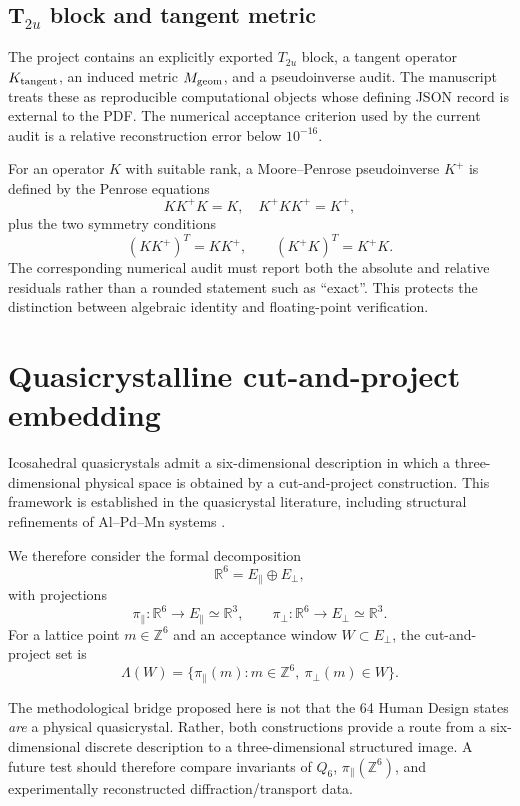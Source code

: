 \documentclass[11pt,a4paper]{article}
\numberwithin{equation}{section}
\newcommand{\R}{\mathbb{R}}
\newcommand{\Z}{\mathbb{Z}}
\begin{document}
\subsection{T$_{2u}$ block and tangent metric}

The project contains an explicitly exported $T_{2u}$ block, a tangent operator $K_{\rm tangent}$, an induced metric $M_{\rm geom}$, and a pseudoinverse audit. The manuscript treats these as reproducible computational objects whose defining JSON record is external to the PDF. The numerical acceptance criterion used by the current audit is a relative reconstruction error below $10^{-16}$.

For an operator $K$ with suitable rank, a Moore--Penrose pseudoinverse $K^+$ is defined by the Penrose equations
\[
KK^+K=K,\quad K^+KK^+=K^+,
\]
plus the two symmetry conditions
\[
(KK^+)^T=KK^+,
\qquad
(K^+K)^T=K^+K.
\]
The corresponding numerical audit must report both the absolute and relative residuals rather than a rounded statement such as ``exact''. This protects the distinction between algebraic identity and floating-point verification.

\section{Quasicrystalline cut-and-project embedding}
\label{sec:quasi}

Icosahedral quasicrystals admit a six-dimensional description in which a three-dimensional physical space is obtained by a cut-and-project construction. This framework is established in the quasicrystal literature, including structural refinements of Al--Pd--Mn systems \citep{VanSmaalen1991,YamamotoTakakura2003,YamamotoTakakuraApproximants2003}.

We therefore consider the formal decomposition
\begin{equation}
\R^6=E_{\parallel}\oplus E_{\perp},
\end{equation}
with projections
\[
\pi_{\parallel}:\R^6\rightarrow E_{\parallel}\simeq\R^3,
\qquad
\pi_{\perp}:\R^6\rightarrow E_{\perp}\simeq\R^3.
\]
For a lattice point $m\in\Z^6$ and an acceptance window $W\subset E_{\perp}$, the cut-and-project set is
\begin{equation}
\Lambda(W)=\{\pi_{\parallel}(m):m\in\Z^6,\ \pi_{\perp}(m)\in W\}.
\end{equation}

The methodological bridge proposed here is not that the 64 Human Design states \emph{are} a physical quasicrystal. Rather, both constructions provide a route from a six-dimensional discrete description to a three-dimensional structured image. A future test should therefore compare invariants of $Q_6$, $\pi_{\parallel}(\Z^6)$, and experimentally reconstructed diffraction/transport data.
\end{document}
